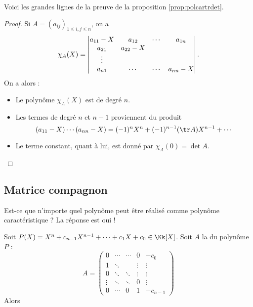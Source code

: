 \documentclass[11pt, class=report,crop=false]{standalone}
\begin{document}
Voici les grandes lignes de la preuve de la proposition \ref{prop:polcartrdet}.
\begin{proof}
Si $A=(a_{ij})_{1\le i,j\le n}$, on a
$$\chi_A(X)
= \begin{vmatrix}a_{11}-X&a_{12}&\cdots&a_{1n}\cr a_{21}&a_{22}-X& & \cr
\vdots& & & \cr a_{n1}&\cdots &\cdots&a_{nn}-X\end{vmatrix}.$$
On a alors :
\begin{itemize}
  \item Le polynôme $\chi_A(X)$ est de degré $n$.
  \item Les termes de degré $n$ et $n-1$ proviennent du produit 
$$(a_{11}-X)\cdots(a_{nn}-X)=(-1)^nX^n+(-1)^{n-1}(\tr A)X^{n-1}+\cdots$$   
  \item Le terme constant, quant à lui, est donné par $\chi_A(0)=\det A$.
\end{itemize}
\end{proof}



\subsection{Matrice compagnon}


Est-ce que n'importe quel polynôme peut être réalisé comme polynôme caractéristique ? La réponse est oui !

\begin{proposition}
Soit $P(X) = X^n+c_{n-1}X^{n-1}+ \cdots +c_1X+c_0 \in \Kk[X]$.
Soit $A$ la  du polynôme $P$ :
$$A = 
\begin{pmatrix}
0&\cdots&\cdots&0&-c_{0}\\
1&\ddots&&\vdots&\vdots\\
0&\ddots&\ddots&\vdots&\vdots\\
\vdots&\ddots&\ddots&0&\vdots\\
0&\cdots&0&1&-c_{n-1}
\end{pmatrix}$$
Alors 
\end{proposition}
\end{document}
